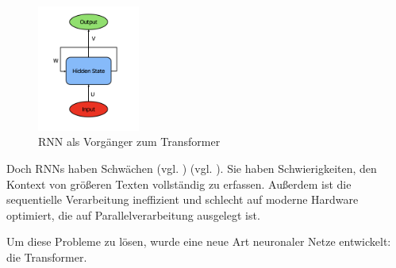 \begin{figure}[ht]
	\centering
	\includegraphics[width=0.3\textwidth]{Bilder/RNN.png}
	\caption{RNN als Vorgänger zum Transformer}
	\label{fig:rnn}
\end{figure}

Doch RNNs haben Schwächen (vgl. \cite[S. 2]{attention}) (vgl. \cite[S. 208]{paass.2020}).
Sie haben Schwierigkeiten, den Kontext von größeren Texten vollständig zu erfassen.  
Außerdem ist die sequentielle Verarbeitung ineffizient und schlecht auf moderne Hardware optimiert, die auf Parallelverarbeitung ausgelegt ist.  

Um diese Probleme zu lösen, wurde eine neue Art neuronaler Netze entwickelt: die Transformer.
